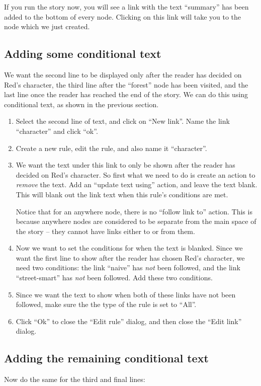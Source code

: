 \documentclass{article}
\begin{document}
If you run the story now, you will see a link with the text ``summary'' has
been added to the bottom of every node. Clicking on this link will take you to
the node which we just created.

\subsection{Adding some conditional text}
We want the second line to be displayed only after the reader has decided on
Red's character, the third line after the ``forest'' node has been visited, and
the last line once the reader has reached the end of the story. We can do this
using conditional text, as shown in the previous section.

\begin{enumerate}
  \item Select the second line of text, and click on ``New link''. Name the link
  ``character'' and click ``ok''.
  \item Create a new rule, edit the rule, and also name it ``character''.
  \item We want the text under this link to only be shown after the reader has
  decided on Red's character. So first what we need to do is create an action
  to \textit{remove} the text. Add an ``update text using'' action, and leave
  the text blank. This will blank out the link text when this rule's conditions
  are met.
  
  Notice that for an anywhere node, there is no ``follow link to'' action. This
  is because anywhere nodes are considered to be separate from the main space
  of the story -- they cannot have links either to or from them.
  
  \item Now we want to set the conditions for when the text is blanked. Since we
  want the first line to show after the reader has chosen Red's character, we
  need two conditions: the link ``naive'' has \textit{not} been followed,
  and the link ``street-smart'' has \textit{not} been followed. Add these two
  conditions.
  \item Since we want the text to show when both of these links have not been
  followed, make sure the the type of the rule is set to ``All''.
\item Click ``Ok'' to close the ``Edit rule'' dialog, and then close the ``Edit
link'' dialog.
\end{enumerate}

\subsection{Adding the remaining conditional text}
Now do the same for the third and final lines:
\end{document}
